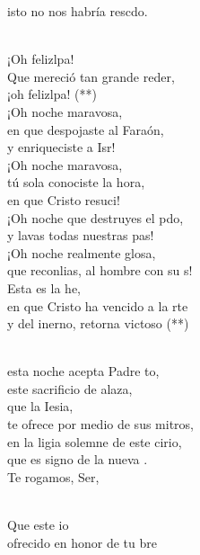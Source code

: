 \begin{cancion}
	isto no nos habría rescdo.\\\jump\\
	\begin{chorus}%
	¡Oh felizlpa!\\
	Que mereció tan grande reder,\\
	¡oh felizlpa! (**)\\
	¡Oh noche maravosa,\\
en que despojaste al Faraón,\\
	y enriqueciste a Isr!\\
	¡Oh noche maravosa,\\
tú sola conociste la hora,\\
	en que Cristo resuci!\\
	¡Oh noche que destruyes el pdo,\\
	y lavas todas nuestras pas!\\
	¡Oh noche realmente glosa,\\
	que reconlias, al hombre con su s!\\
\jump
	Esta es la he,\\
	en que Cristo ha vencido a la rte\\
	y del inerno, retorna victoso (**)\\
	\end{chorus}%
	\jump\\
	esta noche acepta Padre to,\\
	este sacrificio de alaza,\\
	que la Iesia,\\
	te ofrece por medio de sus mitros,\\
	en la ligia solemne de este cirio,\\
	que es signo de la nueva .\\
\jump
	Te rogamos, Ser,\\\jump\\
	\begin{chorus}%
	Que este io\\
	ofrecido en honor de tu bre\\

\end{chorus}
\end{cancion}
